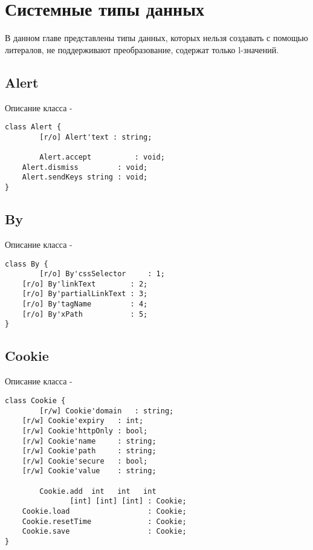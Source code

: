 \section{Системные типы данных}

В данном главе представлены типы данных, которых нельзя создавать с помощью литералов, не поддерживают преобразование, содержат только l-значений.

\subsection{{\color{orange} Alert}}

\noindent Описание класса  -
\begin{lstlisting}[numbers=none]
class Alert {
        [r/o] Alert'text : string;
	
        Alert.accept          : void;
	Alert.dismiss         : void;
	Alert.sendKeys string : void;
}
\end{lstlisting}

\subsection{{\color{orange} By}}

\noindent Описание класса  -
\begin{lstlisting}[numbers=none]
class By {
        [r/o] By'cssSelector     : 1;
	[r/o] By'linkText        : 2;
	[r/o] By'partialLinkText : 3;
	[r/o] By'tagName         : 4;
	[r/o] By'xPath           : 5;
}
\end{lstlisting}

\subsection{{\color{orange} Cookie}}

\noindent Описание класса  -
\begin{lstlisting}[numbers=none]
class Cookie {
        [r/w] Cookie'domain   : string;
	[r/w] Cookie'expiry   : int;
	[r/w] Cookie'httpOnly : bool;
	[r/w] Cookie'name     : string;
	[r/w] Cookie'path     : string;
	[r/w] Cookie'secure   : bool;
	[r/w] Cookie'value    : string;
	
        Cookie.add  int   int   int
	           [int] [int] [int] : Cookie;
	Cookie.load                  : Cookie;
	Cookie.resetTime             : Cookie;
	Cookie.save                  : Cookie;
}
\end{lstlisting}

